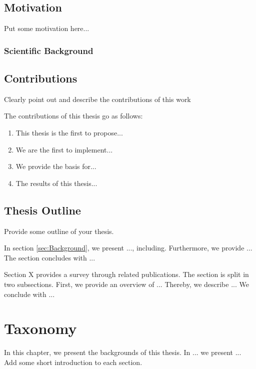 \subsection{Motivation}
\label{sec:motivation}

Put some motivation here...

\subsubsection{Scientific Background}
\label{sec:Scientific Background}

\clearpage
\subsection{Contributions}
\label{sec:contributions}

Clearly point out and describe the contributions of this work

The contributions of this thesis go as follows: 
\begin{enumerate}
	\item This thesis is the first to propose...
	\item We are the first to implement...
	\item We provide the basis for...
	\item The results of this thesis...
\end{enumerate}
\clearpage

\subsection{Thesis Outline}

Provide some outline of your thesis.

  In section  \ref{sec:Background}, we present ..., including. Furthermore, we provide ... The section concludes with ...

 Section X provides a survey through related publications. The section is split in two subsections. First, we provide an overview of ... Thereby, we describe ... We conclude with ...

\section{Taxonomy}
\label{sec:Taxonomy}

In this chapter, we present the backgrounds of this thesis. In ... we present ... Add some short introduction to each section.

